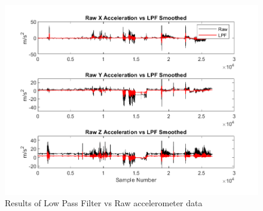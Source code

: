 \documentclass{UoNMCHA}
\numberwithin{equation}{section}
\begin{document}
\begin{figure}[ht]
   \begin{center}
       \includegraphics[width=0.8\linewidth]{Figures/AndroidDataExample}
       \caption{Results of Low Pass Filter vs Raw accelerometer data}
       \label{fig:AndroidDataExample}
   \end{center}
\end{figure}



    
\end{document}
